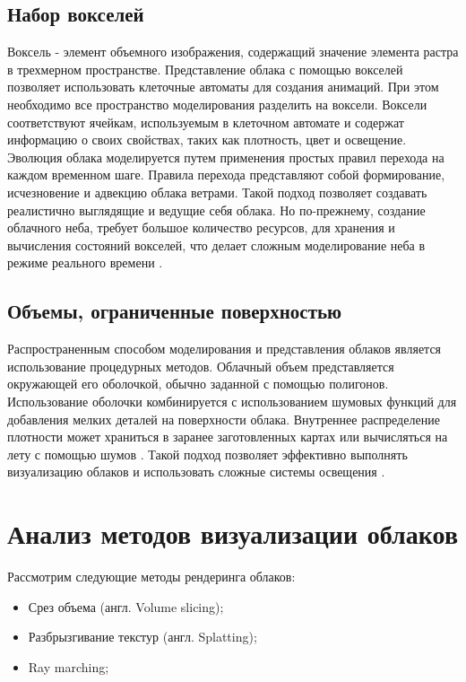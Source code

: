 \subsection{Набор вокселей} 

Воксель - элемент объемного изображения, содержащий значение элемента растра в трехмерном пространстве.
Представление облака с помощью вокселей позволяет использовать клеточные автоматы для создания анимаций. При этом необходимо все пространство моделирования разделить на воксели. Воксели
соответствуют ячейкам, используемым в клеточном автомате и содержат информацию о своих свойствах, таких как плотность, цвет и освещение. Эволюция облака моделируется путем
применения простых правил перехода на каждом временном шаге. Правила перехода представляют собой формирование, исчезновение и адвекцию облака ветрами.
Такой подход позволяет создавать реалистично выглядящие и ведущие себя облака. Но по-прежнему, создание облачного неба, требует большое количество ресурсов, для хранения и вычисления состояний вокселей, что делает сложным моделирование неба в режиме реального времени \cite{voxel}.

\subsection{Объемы, ограниченные поверхностью} 
\label{partmediaref}
Распространенным способом моделирования и представления облаков является использование процедурных методов. Облачный объем представляется окружающей его оболочкой, обычно заданной с помощью полигонов. Использование оболочки комбинируется с использованием шумовых функций для добавления мелких деталей на поверхности облака. Внутреннее распределение плотности может храниться в заранее заготовленных картах или вычисляться на лету с помощью шумов \cite{frostbite}. Такой подход позволяет эффективно выполнять визуализацию облаков и использовать сложные системы освещения \cite{clouds}. 


\section{Анализ методов визуализации облаков}

Рассмотрим следующие методы рендеринга облаков:

\begin{itemize}
	\item Срез объема (англ. Volume slicing);
	\item Разбрызгивание текстур (англ. Splatting);
	\item Ray marching;
\end{itemize}


